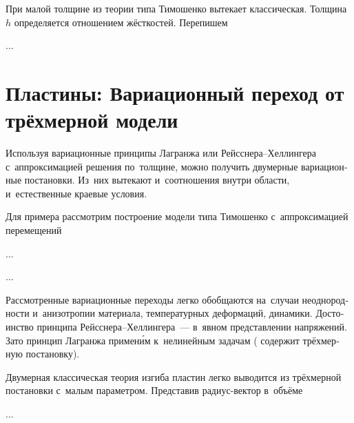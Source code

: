 \begin{otherlanguage}{russian}
При малой толщине из теории типа Тимошенко вытекает классическая. Толщина~$h$ определяется отношением жёсткостей. Перепишем

...



\section{Пластины: Вариационный переход от трёхмерной модели}

Используя вариационные принципы Лагранжа или Рейсснера--Хеллингера с~аппроксимацией решения по~толщине, можно получить двумерные вариационные постановки. Из~них вытекают и~соотношения внутри области, и~естественные краевые условия.

Для примера рассмотрим построение модели типа Тимошенко с~аппроксимацией перемещений

...


...

Рассмотренные вариационные переходы легко обобщаются на~случаи неоднородности и~анизотропии материала, температурных деформаций, динамики. Достоинство принципа Рейсснера--Хеллингера~--- в~явном представлении напряжений. \hbox{Зато} принцип Лагранжа примен\'{и}м к~нелинейным задачам ( содержит трёхмерную постановку).



Двумерная классическая теория изгиба пластин легко выводится из трёхмерной постановки с~малым параметром. Представив радиус\hbox{-}вектор в~объёме

...






\end{otherlanguage}
